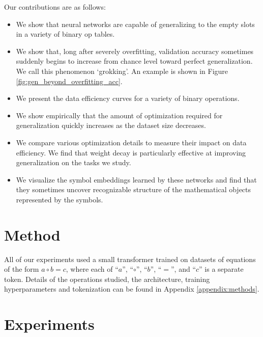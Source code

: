 \documentclass{article} %
\begin{document}
Our contributions are as follows:

\begin{itemize}
    \item We show that neural networks are capable of generalizing to the empty slots in a variety of binary op tables.
    \item We show that, long after severely overfitting, validation accuracy sometimes suddenly begins to increase from chance level toward perfect generalization. We call this phenomenon `grokking'. An example is shown in Figure \ref{fig:gen_beyond_overfitting_acc}.
    \item We present the data efficiency curves for a variety of binary operations.
    \item We show empirically that the amount of optimization required for generalization quickly increases as the dataset size decreases.
    \item We compare various optimization details to measure their impact on data efficiency. We find that weight decay is particularly effective at improving generalization on the tasks we study.
    \item We visualize the symbol embeddings learned by these networks and find that they sometimes uncover recognizable structure of the mathematical objects represented by the symbols.
\end{itemize}

\section{Method}
All of our experiments used a small transformer trained on datasets of equations of the form $a \circ b = c$, where each of ``$a$'', ``$\circ$'', ``$b$'', ``$=$'', and ``$c$'' is a separate token. Details of the operations studied, the architecture, training hyperparameters and tokenization can be found in Appendix \ref{appendix:methods}.

\section{Experiments}
\end{document}
